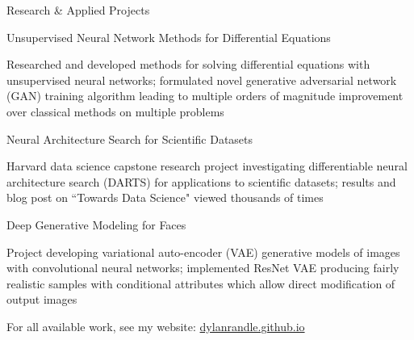 \documentclass{resume} %
\begin{document}

\begin{rSection}{Research \& Applied Projects}

\begin{rSubsection}{Unsupervised Neural Network Methods for Differential Equations}{}{}{}

  \item Researched and developed methods for solving differential equations with unsupervised neural networks; formulated novel generative adversarial network (GAN) training algorithm leading to multiple orders of magnitude improvement over classical methods on multiple problems
  
\end{rSubsection}

\begin{rSubsection}{Neural Architecture Search for Scientific Datasets}{}{}{}

  \item Harvard data science capstone research project investigating differentiable neural architecture search (DARTS) for applications to scientific datasets; results and blog post on ``Towards Data Science" viewed thousands of times
  
\end{rSubsection}

\begin{rSubsection}{Deep Generative Modeling for Faces}{}{}{}

	\item Project developing variational auto-encoder (VAE) generative models of images with convolutional neural networks; implemented ResNet VAE producing fairly realistic samples with conditional attributes which allow direct modification of output images
	
\end{rSubsection}

For all available work, see my website: \url{dylanrandle.github.io}

\end{rSection}

\end{document}
